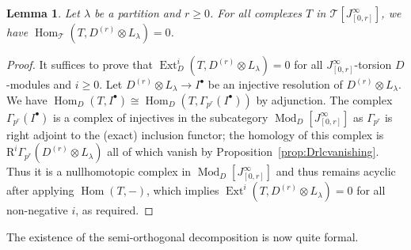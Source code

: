 \documentclass[12pt]{amsart}
\newcommand{\rR}{\mathrm{R}}
\newcommand{\cT}{\mathcal{T}}
\DeclareMathOperator{\ext}{Ext}
\DeclareMathOperator{\Hom}{Hom}
\DeclareMathOperator{\Mod}{Mod}
\newcommand{\mGau}{\Gamma_{u}}
\numberwithin{equation}{section}
\newtheorem{proposition}[equation]{Proposition}
\newtheorem{lemma}[equation]{Lemma}
\theoremstyle{definition}
\theoremstyle{plain}
\begin{document}
\begin{lemma}\label{lem:orth}
    Let $\lambda$ be a partition and $r \geq 0$. For all complexes $T$ in $\cT[J_{[0,r]}^{\infty}]$, we have $\Hom_\cT(T, D^{(r)} \otimes L_{\lambda}) = 0$. 
\end{lemma}
\begin{proof}
    It suffices to prove that $\ext^i_D(T, D^{(r)}\otimes L_{\lambda}) = 0$ for all $J_{[0,r]}^{\infty}$-torsion $D$-modules and $i \geq 0$. Let $D^{(r)}\otimes L_{\lambda} \to I^{\bullet}$ be an injective resolution of $D^{(r)} \otimes L_{\lambda}$. We have $\Hom_D(T, I^{\bullet}) \cong \Hom_{D}(T, \Gamma_{p^r}(I^{\bullet}))$ by adjunction. 
    The complex $\Gamma_{p^r}(I^{\bullet})$ is a complex of injectives in the subcategory $\Mod_D[J_{[0,r]}^{\infty}]$ as $\Gamma_{p^r}$ is right adjoint to the (exact) inclusion functor; the homology of this complex is $\rR^i\Gamma_{p^r}(D^{(r)} \otimes L_{\lambda})$ all of which vanish by Proposition~\ref{prop:Drlcvanishing}. Thus it is a nullhomotopic complex in $\Mod_D[J_{[0,r]}^{\infty}]$  and thus remains acyclic after applying $\Hom(T,-)$, which implies $\ext^i(T, D^{(r)} \otimes L_{\lambda})=0$ for all non-negative $i$, as required.
\end{proof}

The existence of the semi-orthogonal decomposition is now quite formal.
\end{document}
